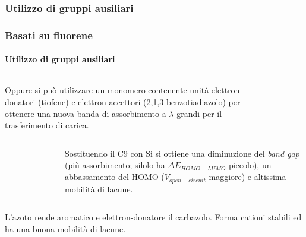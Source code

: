 \subsubsection{Utilizzo di gruppi ausiliari}\begin{frame}\frametitle{Basati su fluorene}\framesubtitle{Utilizzo di gruppi ausiliari}
\begin{columns}Oppure si può utilizzare un monomero contenente unità elettron-donatori (tiofene) e elettron-accettori (2,1,3-benzotiadiazolo) per ottenere una nuova banda di assorbimento a $\lambda$ grandi per il trasferimento di carica.
\vspace{-35pt}\begin{figure}{}\end{figure}
\end{columns}\vspace{10pt}
\begin{columns}\begin{figure}{}\end{figure}
Sostituendo il C9 con Si si ottiene una diminuzione del \emph{band gap} (più assorbimento; silolo ha $\Delta E_{HOMO-LUMO}$ piccolo), un abbassamento del HOMO ($V_{open-circuit}$ maggiore) e altissima mobilità di lacune.
\end{columns}

\end{frame}

\logo{}
L'azoto 
rende aromatico e elettron-donatore il carbazolo. Forma cationi stabili ed ha una buona mobilità di lacune.

